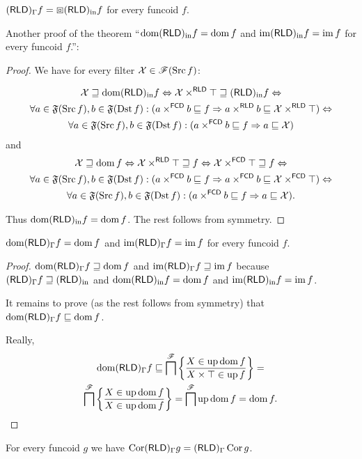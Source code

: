 \begin{conjecture}
$(\mathsf{RLD})_{\Gamma}f=\boxbox(\mathsf{RLD})_{\mathrm{in}} f$ for every funcoid $f$.
\end{conjecture}
Another proof of the theorem ``$\operatorname{dom}(\mathsf{RLD})_{\mathrm{in}} f=\operatorname{dom} f$ and $\operatorname{im}(\mathsf{RLD})_{\mathrm{in}} f=\operatorname{im} f$
for every funcoid $f$.'':
\begin{proof}
We have for every filter $\mathcal{X}\in\mathscr{F}(\operatorname{Src} f)$:

\begin{multline*}
\mathcal{X}\sqsupseteq\operatorname{dom}(\mathsf{RLD})_{\mathrm{in}} f\Leftrightarrow\mathcal{X}\times^{\mathsf{RLD}}\top\sqsupseteq(\mathsf{RLD})_{\mathrm{in}} f\Leftrightarrow\\
\forall a\in\mathfrak{F}(\operatorname{Src} f),b\in\mathfrak{F}(\operatorname{Dst} f):(a\times^{\mathsf{FCD}}b\sqsubseteq f\Rightarrow a\times^{\mathsf{RLD}}b\sqsubseteq\mathcal{X}\times^{\mathsf{RLD}}\top)\Leftrightarrow\\
\forall a\in\mathfrak{F}(\operatorname{Src} f),b\in\mathfrak{F}(\operatorname{Dst} f):(a\times^{\mathsf{FCD}}b\sqsubseteq f\Rightarrow a\sqsubseteq\mathcal{X})
\end{multline*}
and 
\begin{multline*}
\mathcal{X}\sqsupseteq\operatorname{dom} f\Leftrightarrow\mathcal{X}\times^{\mathsf{RLD}}\top\sqsupseteq f\Leftrightarrow\mathcal{X}\times^{\mathsf{FCD}}\top\sqsupseteq f\Leftrightarrow\\
\forall a\in\mathfrak{F}(\operatorname{Src} f),b\in\mathfrak{F}(\operatorname{Dst} f):(a\times^{\mathsf{FCD}}b\sqsubseteq f\Rightarrow a\times^{\mathsf{FCD}}b\sqsubseteq\mathcal{X}\times^{\mathsf{FCD}}\top)\Leftrightarrow\\
\forall a\in\mathfrak{F}(\operatorname{Src} f),b\in\mathfrak{F}(\operatorname{Dst} f):(a\times^{\mathsf{FCD}}b\sqsubseteq f\Rightarrow a\sqsubseteq\mathcal{X}).
\end{multline*}


Thus $\operatorname{dom}(\mathsf{RLD})_{\mathrm{in}} f=\operatorname{dom} f$. The rest follows from symmetry.\end{proof}
\begin{prop}
$\operatorname{dom}(\mathsf{RLD})_{\Gamma}f=\operatorname{dom} f$ and $\operatorname{im}(\mathsf{RLD})_{\Gamma}f=\operatorname{im} f$
for every funcoid $f$.\end{prop}
\begin{proof}
$\operatorname{dom}(\mathsf{RLD})_{\Gamma}f\sqsupseteq\operatorname{dom} f$ and $\operatorname{im}(\mathsf{RLD})_{\Gamma}f\sqsupseteq\operatorname{im} f$
because $(\mathsf{RLD})_{\Gamma}f\sqsupseteq(\mathsf{RLD})_{\mathrm{in}}$ and $\operatorname{dom}(\mathsf{RLD})_{\mathrm{in}} f=\operatorname{dom} f$
and $\operatorname{im}(\mathsf{RLD})_{\mathrm{in}} f=\operatorname{im} f$.

It remains to prove (as the rest follows from symmetry) that $\operatorname{dom}(\mathsf{RLD})_{\Gamma}f\sqsubseteq\operatorname{dom} f$.

Really, 
\begin{multline*}
\operatorname{dom}(\mathsf{RLD})_{\Gamma}f\sqsubseteq\bigsqcap^{\mathscr{F}}\left\{ \frac{X\in\operatorname{up}\operatorname{dom} f}{X\times\top\in\operatorname{up} f}\right\}=\\
\bigsqcap^{\mathscr{F}}\left\{ \frac{X\in\operatorname{up}\operatorname{dom} f}{X\in\operatorname{up}\operatorname{dom} f}\right\}=\bigsqcap^{\mathscr{F}}\operatorname{up}\operatorname{dom} f=\operatorname{dom} f.
\end{multline*}
\end{proof}
\begin{conjecture}
For every funcoid $g$ we have $\operatorname{Cor}(\mathsf{RLD})_{\Gamma}g=(\mathsf{RLD})_{\Gamma}\operatorname{Cor} g$.
\end{conjecture}

